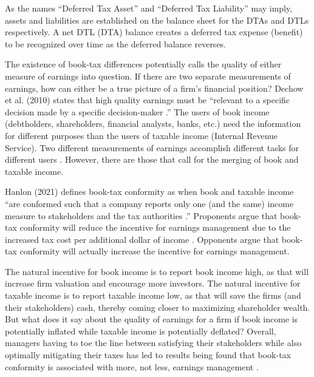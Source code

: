 \documentclass{article}
\begin{document}
As the names “Deferred Tax Asset” and “Deferred Tax Liability” may imply, assets and liabilities are established on the balance sheet for the DTAs and DTLs respectively. A net DTL (DTA) balance creates a deferred tax expense (benefit) to be recognized over time as the deferred balance reverses.

The existence of book-tax differences potentially calls the quality of either measure of earnings into question. If there are two separate measurements of earnings, how can either be a true picture of a firm’s financial position? Dechow et al. (2010) states that high quality earnings must be “relevant to a specific decision made by a specific decision-maker \citep{Dechow10}.” The users of book income (debtholders, shareholders, financial analysts, banks, etc.) need the information for different purposes than the users of taxable income (Internal Revenue Service). Two different measurements of earnings accomplish different tasks for different users \citep{Blaylock15}. However, there are those that call for the merging of book and taxable income.

Hanlon (2021) defines book-tax conformity as when book and taxable income “are conformed such that a company reports only one (and the same) income measure to stakeholders and the tax authorities \citep{Hanlon21}.” Proponents argue that book-tax conformity will reduce the incentive for earnings management due to the increased tax cost per additional dollar of income \citep{Blaylock15}. Opponents argue that book-tax conformity will actually increase the incentive for earnings management.

The natural incentive for book income is to report book income high, as that will increase firm valuation and encourage more investors. The natural incentive for taxable income is to report taxable income low, as that will save the firms (and their stakeholders) cash, thereby coming closer to maximizing shareholder wealth. But what does it say about the quality of earnings for a firm if book income is potentially inflated while taxable income is potentially deflated? Overall, managers having to toe the line between satisfying their stakeholders while also optimally mitigating their taxes has led to results being found that book-tax conformity is associated with more, not less, earnings management \citep{Blaylock15} \citep{Hanlon21}. 
\end{document}
